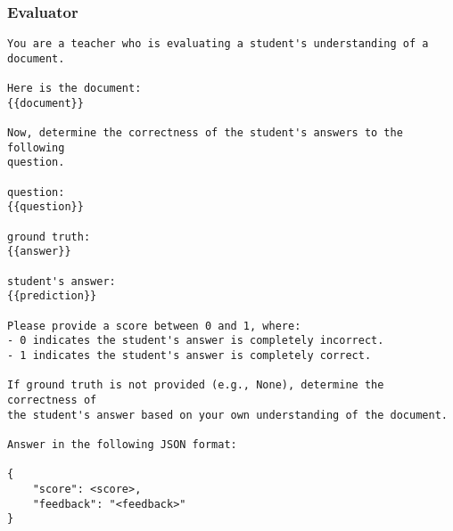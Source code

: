 \subsubsection{Evaluator}
\begin{tcolorbox}[title=Evaluator, myboxstyle, breakable]
\begin{verbatim}
You are a teacher who is evaluating a student's understanding of a document.

Here is the document: 
{{document}}

Now, determine the correctness of the student's answers to the following 
question.

question: 
{{question}}

ground truth: 
{{answer}}

student's answer: 
{{prediction}}

Please provide a score between 0 and 1, where:
- 0 indicates the student's answer is completely incorrect.
- 1 indicates the student's answer is completely correct.

If ground truth is not provided (e.g., None), determine the correctness of 
the student's answer based on your own understanding of the document.

Answer in the following JSON format:

{
    "score": <score>,
    "feedback": "<feedback>"
}
\end{verbatim}
\end{tcolorbox}

